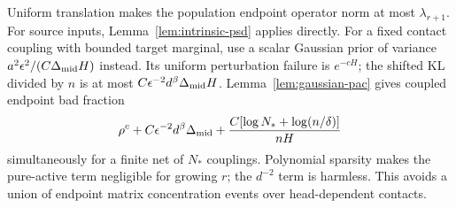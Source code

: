 Uniform translation makes the population endpoint operator norm at most
$\lambda_{r+1}$. For source inputs, Lemma~\ref{lem:intrinsic-psd}
applies directly. For a fixed contact coupling with bounded target
marginal, use a scalar Gaussian prior of variance
$a^2\epsilon^2/(C\Delta_{\rm mid}H)$ instead. Its uniform perturbation
failure is $e^{-cH}$; the shifted KL divided by $n$ is at most
$C\epsilon^{-2}d^\beta\Delta_{\rm mid}H$.
Lemma~\ref{lem:gaussian-pac} gives coupled endpoint bad fraction
\[
 \rho^c+C\epsilon^{-2}d^\beta\Delta_{\rm mid}
       +\frac{C[\log N_*+\log(n/\delta)]}{nH}
\]
simultaneously for a finite net of $N_*$ couplings. Polynomial sparsity
makes the pure-active term negligible for growing $r$; the $d^{-2}$
term is harmless. This avoids a union of endpoint matrix concentration
events over head-dependent contacts.
